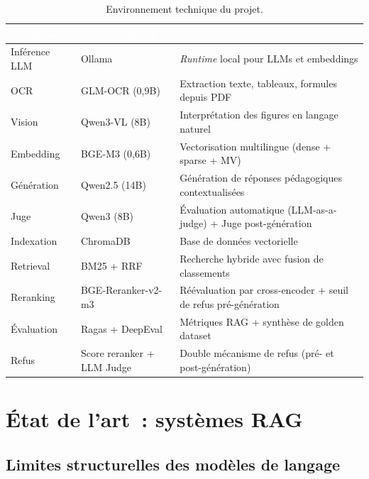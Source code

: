 \documentclass[11pt,a4paper]{article}
\begin{document}
\begin{table}[H]
\centering
\begin{tabularx}{\linewidth}{L{3cm} L{4cm} L{5.5cm}}
\toprule
{}
\textcolor{white}{\textbf{Composant}} & \textcolor{white}{\textbf{Outil / Modèle}} & \textcolor{white}{\textbf{Rôle}} \\
\midrule
Inférence LLM   & Ollama                  & \textit{Runtime} local pour LLMs et embeddings \\
OCR             & GLM-OCR (0,9B)          & Extraction texte, tableaux, formules depuis PDF \\
Vision          & Qwen3-VL (8B)           & Interprétation des figures en langage naturel \\
Embedding       & BGE-M3 (0,6B)           & Vectorisation multilingue (dense + sparse + MV) \\
Génération      & Qwen2.5 (14B)           & Génération de réponses pédagogiques contextualisées \\
Juge            & Qwen3 (8B)              & Évaluation automatique (LLM-as-a-judge) + Juge post-génération \\
Indexation      & ChromaDB                & Base de données vectorielle \\
Retrieval       & BM25 + RRF              & Recherche hybride avec fusion de classements \\
Reranking       & BGE-Reranker-v2-m3     & Réévaluation par cross-encoder + seuil de refus pré-génération \\
Évaluation      & Ragas + DeepEval        & Métriques RAG + synthèse de golden dataset \\
Refus           & Score reranker + LLM Judge & Double mécanisme de refus (pré- et post-génération) \\
\bottomrule
\end{tabularx}
\caption{Environnement technique du projet.}
\label{tab:env-tech}
\end{table}

\section{État de l'art~: systèmes RAG}
\label{sec:etat-art}

\subsection{Limites structurelles des modèles de langage}
\end{document}

